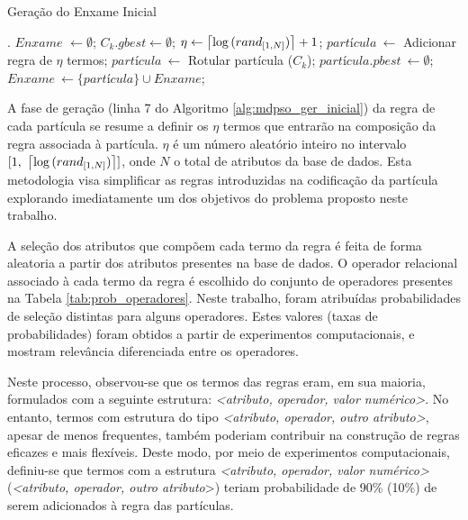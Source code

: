 \documentclass[
	12pt,				%
	openany,			%
	oneside,	
	a4paper,			%
	brazil,				%
	]{unimontes-ppgmsc-abntex2}
\DeclarePairedDelimiter{\ceil}{\lceil}{\rceil}
\begin{document}
\begin{algorithm}[ht]
\caption{Geração do Enxame Inicial}
\label{alg:mdpso_ger_inicial}
\begin{algorithmic}[1]
.
\State $Enxame$ $\leftarrow \emptyset$;
 \State $C_k.gbest \leftarrow \emptyset$;
\EndFor
{}
 \State $\eta \leftarrow \ceil[\big]{\log{(rand_{[1, N]})}} + 1$;
 \State $partícula\ \leftarrow$ Adicionar regra de $\eta$ termos;
 \State $partícula\ \leftarrow$ Rotular partícula ($C_k$);
 \State $partícula.pbest\ \leftarrow  \emptyset$;
 \State $Enxame\ \leftarrow  \{partícula\} \cup Enxame$;
\EndFor
\end{algorithmic}
\end{algorithm}

A fase de geração (linha 7 do Algoritmo \ref{alg:mdpso_ger_inicial}) da regra de cada partícula se resume a definir os $\eta$ termos que entrarão na composição da regra associada à partícula. $\eta$ é um número aleatório inteiro no intervalo $[1, \  \ceil[\big]{\log{(rand_{[1, N]})}}]$, onde $N$ o total de atributos da base de dados. Esta metodologia visa simplificar as regras introduzidas na codificação da partícula explorando imediatamente um dos objetivos do problema proposto neste trabalho.
 
A seleção dos atributos que compõem cada termo da regra é feita de forma aleatoria a partir dos atributos presentes na base de dados. O operador relacional associado à cada termo da regra é escolhido do conjunto de operadores presentes na Tabela \ref{tab:prob_operadores}. Neste trabalho, foram atribuídas probabilidades de seleção distintas para alguns operadores. Estes valores (taxas de probabilidades) foram obtidos a partir de experimentos computacionais, e mostram relevância diferenciada entre os operadores.

Neste processo, observou-se que os termos das regras eram, em sua maioria, formulados com a seguinte estrutura: \textit{<atributo, operador, valor numérico>}. No entanto, termos com estrutura do tipo \textit{<atributo, operador, outro atributo>}, apesar de menos frequentes, também poderiam contribuir na construção de regras eficazes e mais flexíveis. Deste modo, por meio de experimentos computacionais, definiu-se que termos com a estrutura \textit{<atributo, operador, valor numérico>} (\textit{<atributo, operador, outro atributo}>) teriam probabilidade de 90\% (10\%) de serem adicionados à regra das partículas.
\end{document}
